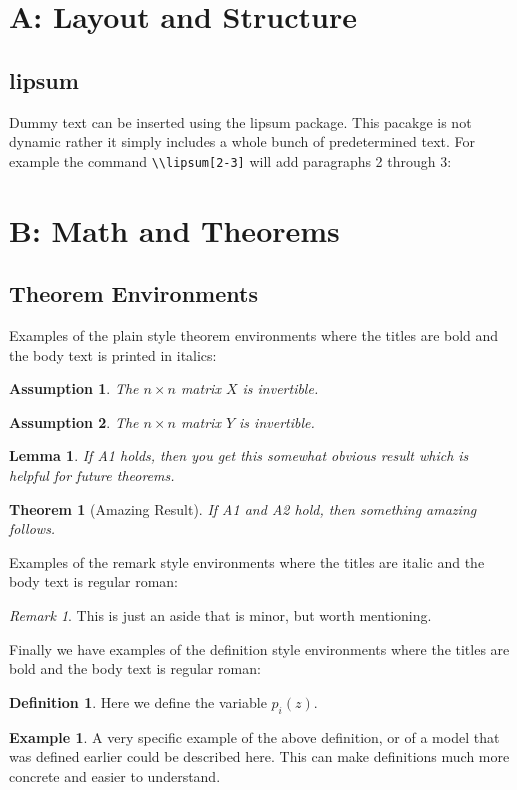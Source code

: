 \documentclass[]{article}
\theoremstyle{plain}
\newtheorem{theorem}{Theorem}
\newtheorem{lemma}{Lemma}
\newtheorem{assumption}{Assumption}
\theoremstyle{remark}
\newtheorem{remark}{Remark}
\theoremstyle{definition}
\newtheorem{definition}{Definition}
\newtheorem{example}{Example}
\newcounter{theo}[section]\setcounter{theo}{0}
\begin{document}
\section*{A: Layout and Structure}
	
	\subsection*{lipsum}
	Dummy text can be inserted using the lipsum package. 
	This pacakge is not dynamic rather it simply includes a whole bunch of predetermined text.
	For example the command \verb|\\lipsum[2-3]| will add paragraphs 2 through 3:
	
	\lipsum[2-3]
	
\section*{B: Math and Theorems}
	
	\subsection*{Theorem Environments}
	Examples of the plain style theorem environments where the titles are bold and the body text is printed in italics:
	\begin{assumption}
		The $ n\times n $ matrix $ X $ is invertible.
	\end{assumption}
	\begin{assumption}
		The $ n\times n $ matrix $ Y $ is invertible.
	\end{assumption}
	\begin{lemma}
		If A1 holds, then you get this somewhat obvious result which is helpful for future theorems.
	\end{lemma}
	\begin{theorem}[Amazing Result]
		If A1 and A2 hold, then something amazing follows.
	\end{theorem}

	\noindent Examples of the remark style environments where the titles are italic and the body text is regular roman:
	\begin{remark}
		This is just an aside that is minor, but worth mentioning.
	\end{remark}

	\noindent Finally we have examples of the definition style environments where the titles are bold and the body text is regular roman:
	\begin{definition}
		Here we define the variable $ p_i(z) $.
	\end{definition}
	\begin{example}
		A very specific example of the above definition, or of a model that was defined earlier could be described here.
		This can make definitions much more concrete and easier to understand.
	\end{example}
\end{document}
